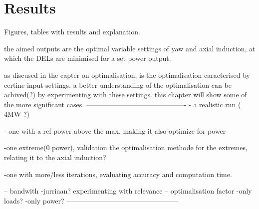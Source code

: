 \section{Results}

Figures, tables with results and explanation.

the aimed outputs are the optimal variable settings of yaw and axial induction, at which the DELs are minimised for a set power output.

as discused in the capter on optimalisation, is the optimalisation caracterised by certine input settings. a better understanding of the optimalisation can be achived(?) by experimenting with these settings. this chapter will show some of the more significant cases.
-------------------------------------------
- a realistic run ( 4MW ?)

- one with a ref power above the max, making it also optimize for power

-one extreme(0 power), validation the optimalisation methode for the extremes, relating it to the axial induction?

-one with more/less iterations, evaluating accuracy and computation time.
  
-- bandwith
       -jurriaan? experimenting with relevance 
-- optimalisation factor 
       -only loads?
       -only power?
------------------------------------------------       
         